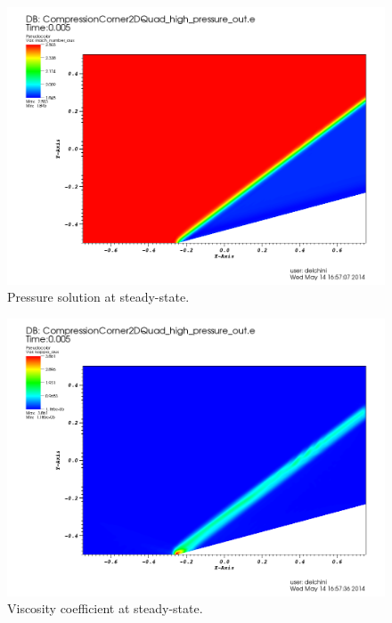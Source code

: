          \begin{figure}[H]%
                \centering
                \includegraphics[scale=.50]{figures/CCDensityTimeStt.png}
                \caption{Pressure solution at steady-state.}
                \label{fig:2d_cpc_rho_stt}
        \end{figure}%
        \begin{figure}[H]%
                \centering
                \includegraphics[scale=.50]{figures/CCViscosityTimeStt.png}
                \caption{Viscosity coefficient at steady-state.}
                \label{fig:2d_cpc_visc_stt}
        \end{figure}
